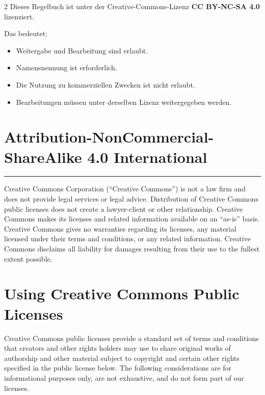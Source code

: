 \clearpage
{}
{}
\clearpage
{}


\begin{multicols*}{2}
    Dieses Regelbuch ist unter der Creative-Commons-Lizenz
    \textbf{CC BY-NC-SA 4.0} lizenziert.

    Das bedeutet:
    \begin{itemize}[leftmargin=*,nosep]
\item Weitergabe und Bearbeitung sind erlaubt.
\item Namensnennung ist erforderlich.
\item Die Nutzung zu kommerziellen Zwecken ist nicht erlaubt.
\item Bearbeitungen m\"ussen unter derselben Lizenz weitergegeben werden.
    \end{itemize}
    \small
    \sloppy


    \section*{Attribution-NonCommercial-ShareAlike 4.0 International}

    \noindent\rule{\linewidth}{0.4pt}

    Creative Commons Corporation (``Creative Commons'') is not a law firm and
    does not provide legal services or legal advice. Distribution of
    Creative Commons public licenses does not create a lawyer-client or
    other relationship. Creative Commons makes its licenses and related
    information available on an ``as-is'' basis. Creative Commons gives no
    warranties regarding its licenses, any material licensed under their
    terms and conditions, or any related information. Creative Commons
    disclaims all liability for damages resulting from their use to the
    fullest extent possible.


    \section*{Using Creative Commons Public Licenses}

    Creative Commons public licenses provide a standard set of terms and
    conditions that creators and other rights holders may use to share
    original works of authorship and other material subject to copyright
    and certain other rights specified in the public license below. The
    following considerations are for informational purposes only, are not
    exhaustive, and do not form part of our licenses.


\end{multicols*}
